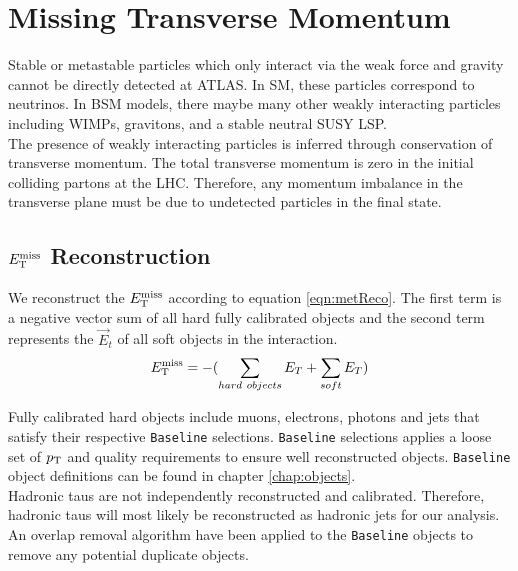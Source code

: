 \section{Missing Transverse Momentum}
\label{sec:reco:MET}

\indent Stable or metastable particles which only interact via the weak force and gravity cannot be directly detected at ATLAS.  In SM, these particles correspond to neutrinos.  In BSM models, there maybe many other weakly interacting particles including WIMPs, gravitons, and a stable neutral SUSY LSP. \\

\indent The presence of weakly interacting particles is inferred through conservation of transverse momentum.  The total transverse momentum is zero in the initial colliding partons at the LHC.  Therefore, any momentum imbalance in the transverse plane must be due to undetected particles in the final state.  \\

\subsection{$E_{\mathrm{T}}^{\mathrm{miss}}$ Reconstruction}
\label{sec:MET:reco}

\indent We reconstruct the $E_{\mathrm{T}}^{\mathrm{miss}}$ according to equation \ref{eqn:metReco}.  The first term is a negative vector sum of all hard fully calibrated objects and the second term represents the $\vec{E}_t$ of all soft objects in the interaction.  \\

\begin{equation}
E_{\mathrm{T}}^{\mathrm{miss}} = - ( \sum_{hard~objects} E_T + \sum_{soft} E_T ) 
\label{eqn:metReco}
\end{equation}

\indent Fully calibrated hard objects include muons, electrons, photons and jets that satisfy their respective {\tt Baseline} selections.  {\tt Baseline} selections applies a loose set of $p_{\mathrm{T}}$ and quality requirements to ensure well reconstructed objects.  {\tt Baseline} object definitions can be found in chapter \ref{chap:objects}. \\

\indent Hadronic taus are not independently reconstructed and calibrated.  Therefore, hadronic taus will most likely be reconstructed as hadronic jets for our analysis.  An overlap removal algorithm have been applied to the {\tt Baseline} objects to remove any potential duplicate objects. \\

